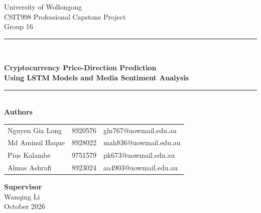 \documentclass[12pt]{article}
\begin{document}
\begin{titlepage}
\centering
\vspace*{2.5cm}
{\large University of Wollongong}\\[0.3cm]
{\large CSIT998 Professional Capstone Project}\\[0.2cm]
{\large Group 16}\\[1.2cm]
\rule{\textwidth}{0.6pt}\\[0.6cm]
{\LARGE\bfseries Cryptocurrency Price-Direction Prediction\\[0.2cm] Using LSTM Models and Media Sentiment Analysis\par}
\vspace{0.6cm}
\rule{\textwidth}{0.6pt}\\[1.4cm]
{\large\bfseries Authors}\\[0.4cm]
{\normalsize
\begin{tabular}{lll}
Nguyen Gia Long & 8920576 & gln767@uowmail.edu.au\\[2pt]
Md Aminul Haque & 8928022 & mah836@uowmail.edu.au\\[2pt]
Pius Kalambe & 9751579 & pk673@uowmail.edu.au\\[2pt]
Almas Ashrafi & 8923024 & aa4903@uowmail.edu.au
\end{tabular}\par}
\vspace{1.2cm}
{\large\bfseries Supervisor}\\[0.3cm]
{\normalsize Wanqing Li}\\[2cm]
{\normalsize October 2026}
\end{titlepage}

\begin{abstract}
Predicting whether Bitcoin will close higher tomorrow is difficult, and it is unclear whether news sentiment adds information beyond prices. This project tests the question with 2,069 daily BTCUSDT observations from Binance (January 2021 to August 2026) and 250,475 cleaned Bitcoin headlines from GDELT. A price-only LSTM is compared with an LSTM that also receives daily VADER sentiment, using a 14-day window, one frozen configuration and ten random seeds. On 334 untouched test days, the price-only ensemble was correct on 50.0\% of days, the VADER version on 48.5\%, and a rule that always predicts ``not up'' on 51.5\%. The 1.5-point gap has a 95\% bootstrap interval of $-5.7$ to $+2.4$ points, and FinBERT sentiment led to the same conclusion. An eight-period walk-forward evaluation over 1,338 days agreed, with no reliable sentiment effect. A lag analysis suggests why: FinBERT sentiment correlates 0.45 with the previous day's return and about zero with the next day's, so headlines mostly describe moves that have already happened. A web interface replays the saved predictions against the actual price. The main contribution is a transparent, reproducible evaluation of a near-chance result.
\end{abstract}
\end{document}
